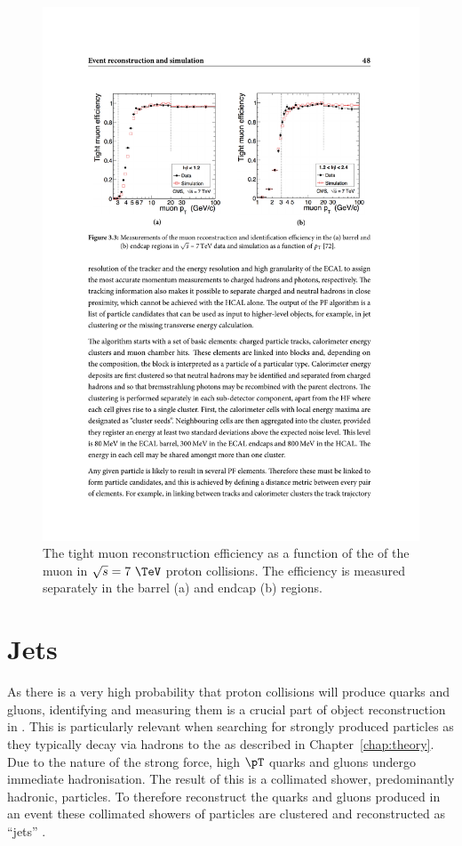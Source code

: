 \begin{figure}
\begin{center}
\includegraphics[width=0.9\linewidth]{figs/reconstruction/muonEff} \end{center}
\caption{ The tight muon reconstruction efficiency as a function of the
\pt of the muon in $\sqrt{s}=7~\tev$ proton collisions. The efficiency
is measured separately in the barrel (a) and endcap (b) regions.
\cite{1748-0221-7-10-P10002}}
\label{fig:muonEff} \end{figure}

\section{Jets}
\label{sec:jets_reco}

As there is a very high probability that proton collisions will
produce quarks and gluons, identifying and measuring them is a crucial part of
object reconstruction in \CMS. This is particularly relevant when
searching for strongly produced \SUSY particles as they typically
decay via hadrons to the \LSP as described in
Chapter~\ref{chap:theory}. Due to the nature of the strong force,
high $\pT$ quarks and gluons undergo immediate hadronisation. The
result of this is a collimated shower, predominantly hadronic,
particles. To therefore reconstruct the quarks and gluons produced in
an event these collimated showers of particles are clustered and
reconstructed as ``jets'' \cite{Salam2010}.


